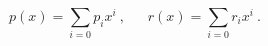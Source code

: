 \begin{equation}
p(x) = \sum \limits _{i=0}^{} p_i x^i\ , \ \ \ \ \ \ \
r(x) = \sum \limits _{i=0}^{} r_i x^i\ .
\label{2.7}
\end{equation}

